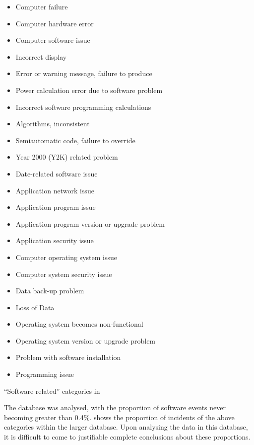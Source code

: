 \documentclass{cshonours}
\begin{document}
\begin{table}
\begin{multicols}{2}
{\smaller
\begin{itemize}
  \item Computer failure
  \item Computer hardware error
  \item Computer software issue
  \item Incorrect display
  \item Error or warning message, failure to produce
  \item Power calculation error due to software problem
  \item Incorrect software programming calculations
  \item Algorithms, inconsistent
  \item Semiautomatic code, failure to override
  \item Year 2000 (Y2K) related problem
  \item Date-related software issue
  \item Application network issue
  \item Application program issue
  \item Application program version or upgrade problem
  \item Application security issue
  \item Computer operating system issue
  \item Computer system security issue
  \item Data back-up problem
  \item Loss of Data
  \item Operating system becomes non-functional
  \item Operating system version or upgrade problem
  \item Problem with software installation
  \item Programming issue
\end{itemize}
}
\end{multicols}
  \caption{``Software related'' categories in \maude}
  \label{tab:fdacategories}
\end{table}

The database was analysed, with the proportion of software events never becoming greater than 0.4\%.  shows the proportion of incidents of the above categories within the larger database. Upon analysing the data in this database, it is difficult to come to justifiable complete conclusions about these proportions.
\end{document}
